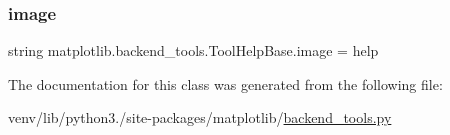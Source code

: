 \subsubsection{\texorpdfstring{image}{image}}
{\footnotesize\ttfamily string matplotlib.\+backend\+\_\+tools.\+Tool\+Help\+Base.\+image = \textquotesingle{}help\textquotesingle{}\hspace{0.3cm}{\ttfamily [static]}}



The documentation for this class was generated from the following file\+:\begin{DoxyCompactItemize}
\item 
venv/lib/python3./site-\/packages/matplotlib/\hyperlink{backend__tools_8py}{backend\+\_\+tools.\+py}\end{DoxyCompactItemize}
